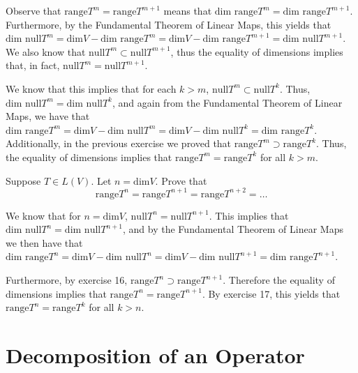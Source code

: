 \begin{solution}

    Observe that $\text{range} T^m = \text{range} T^{m+1}$ means that $\text{dim range} T^m = \text{dim range} T^{m+1}$. Furthermore, by the Fundamental Theorem of Linear Maps, this yields that $\text{dim null} T^m = \text{dim} V - \text{dim range} T^m = \text{dim} V - \text{dim range} T^{m+1} = \text{dim null} T^{m+1}$. We also know that $\text{null} T^m \subset \text{null} T^{m+1}$, thus the equality of dimensions implies that, in fact, $\text{null} T^m = \text{null} T^{m+1}$.

    We know that this implies that for each $k > m$, $\text{null} T^m \subset \text{null} T^k$. Thus, $\text{dim null} T^m = \text{dim null} T^{k}$, and again from the Fundamental Theorem of Linear Maps, we have that $\text{dim range} T^m = \text{dim} V - \text{dim null} T^m = \text{dim} V - \text{dim null} T^{k} = \text{dim range} T^{k}$. Additionally, in the previous exercise we proved that $\text{range} T^m \supset \text{range} T^{k}$. Thus, the equality of dimensions implies that $\text{range} T^m = \text{range} T^k$ for all $k > m$.
\end{solution}

\begin{exercise}{18}
    Suppose $T \in L(V)$. Let $n = \text{dim} V$. Prove that
    $$\text{range} T^n = \text{range} T^{n+1} = \text{range} T^{n+2} = \ldots$$
\end{exercise}

\begin{solution}

    We know that for $n = \text{dim} V$, $\text{null} T^n = \text{null} T^{n+1}$. This implies that $\text{dim null} T^n = \text{dim null} T^{n+1}$, and by the Fundamental Theorem of Linear Maps we then have that $\text{dim range} T^n = \text{dim} V - \text{dim null} T^n = \text{dim} V - \text{dim null} T^{n+1} = \text{dim range} T^{n+1}$.

    Furthermore, by exercise 16, $\text{range} T^n \supset \text{range} T^{n+1}$. Therefore the equality of dimensions implies that $\text{range} T^n = \text{range} T^{n+1}$. By exercise 17, this yields that $\text{range} T^n = \text{range} T^{k}$ for all $k > n$.
\end{solution}

\section{Decomposition of an Operator}

